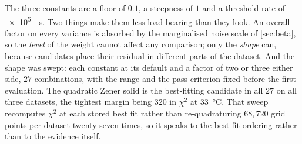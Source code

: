 \documentclass[10pt]{article}
\begin{document}
The three constants are a floor of $0.1$, a steepness of $1$ and a threshold rate of
\SI{e5}{\per\second}. Two things make them less load-bearing than they look. An overall factor
on every variance is absorbed by the marginalised noise scale of \cref{sec:beta}, so the
\emph{level} of the weight cannot affect any comparison; only the \emph{shape} can, because
candidates place their residual in different parts of the dataset. And the shape was swept: each
constant at its default and a factor of two or three either side, $27$ combinations, with the
range and the pass criterion fixed before the first evaluation. The quadratic Zener solid is the
best-fitting candidate in all $27$ on all three datasets, the tightest margin being $320$ in
$\chi^2$ at \SI{33}{\celsius}. That sweep recomputes $\chi^2$ at each stored best fit rather
than re-quadraturing $68{,}720$ grid points per dataset twenty-seven times, so it speaks to the
best-fit ordering rather than to the evidence itself.
\end{document}
